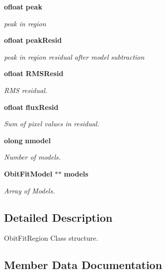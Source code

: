 \begin{CompactItemize}
{\bf ofloat} {\bf peak}
\begin{CompactList}\small\item\em peak in region \item\end{CompactList}\item 
{\bf ofloat} {\bf peak\-Resid}
\begin{CompactList}\small\item\em peak in region residual after model subtraction \item\end{CompactList}\item 
{\bf ofloat} {\bf RMSResid}
\begin{CompactList}\small\item\em RMS residual. \item\end{CompactList}\item 
{\bf ofloat} {\bf flux\-Resid}
\begin{CompactList}\small\item\em Sum of pixel values in residual. \item\end{CompactList}\item 
{\bf olong} {\bf nmodel}
\begin{CompactList}\small\item\em Number of models. \item\end{CompactList}\item 
{\bf Obit\-Fit\-Model} $\ast$$\ast$ {\bf models}
\begin{CompactList}\small\item\em Array of Models. \item\end{CompactList}\end{CompactItemize}


\subsection{Detailed Description}
Obit\-Fit\-Region Class structure. 



\subsection{Member Data Documentation}
